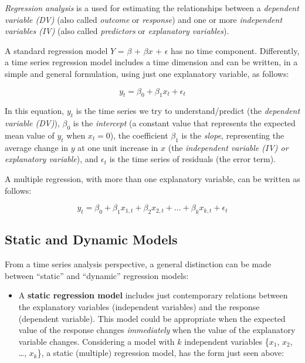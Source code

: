 \documentclass[
]{article}
\providecommand{\tightlist}{%
  \setlength{\itemsep}{0pt}\setlength{\parskip}{0pt}}
\begin{document}
\emph{Regression analysis} is a used for estimating the relationships between a \emph{dependent variable (DV)} (also called \emph{outcome} or \emph{response}) and one or more \emph{independent variables (IV)} (also called \emph{predictors} or \emph{explanatory variables}).

A standard regression model \(Y\) = \(\beta\) + \(\beta x\) + \(\epsilon\) has no time component. Differently, a time series regression model includes a time dimension and can be written, in a simple and general formulation, using just one explanatory variable, as follows:

\[
y_t = \beta_0 + \beta_1x_t + \epsilon_t
\]

In this equation, \(y_t\) is the time series we try to understand/predict (the \emph{dependent variable (DV)}), \(\beta_0\) is the \emph{intercept} (a constant value that represents the expected mean value of \(y_t\) when \(x_t = 0\)), the coefficient \(\beta_1\) is the \emph{slope}, representing the average change in \(y\) at one unit increase in \(x\) (the \emph{independent variable (IV) or explanatory variable}), and \(\epsilon_t\) is the time series of residuals (the error term).

A multiple regression, with more than one explanatory variable, can be written as follows:

\[
y_t = \beta_0 + \beta_1x_{1,t} + \beta_2x_{2,t} + ... + \beta_kx_{k,t} + \epsilon_t
\]

\subsection{Static and Dynamic Models}\label{static-and-dynamic-models}

From a time series analysis perspective, a general distinction can be made between ``static'' and ``dynamic'' regression models:

\begin{itemize}
\tightlist
\item
  A \textbf{static regression model} includes just contemporary relations between the explanatory variables (independent variables) and the response (dependent variable). This model could be appropriate when the expected value of the response changes \emph{immediately} when the value of the explanatory variable changes. Considering a model with \(k\) independent variables \{\(x_1\), \(x_2\), \ldots, \(x_k\)\}, a static (multiple) regression model, has the form just seen above:
\end{itemize}
\end{document}

